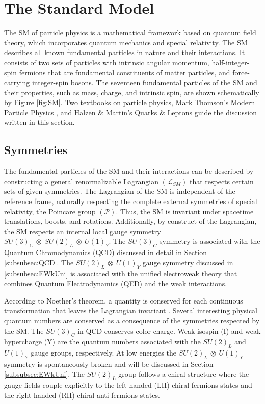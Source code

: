\section{The Standard Model}
\label{sec:SM}

The SM of particle physics is a mathematical framework based on quantum field theory, which incorporates quantum mechanics and special relativity. The SM describes all known fundamental particles in nature and their interactions. It consists of two sets of particles with intrinsic angular momentum, half-integer-spin fermions that are fundamental constituents of matter particles, and force-carrying integer-spin bosons. The seventeen fundamental particles of the SM and their properties, such as mass, charge, and intrinsic spin, are shown schematically by Figure \ref{fig:SM}. Two textbooks on particle physics, Mark Thomson's Modern Particle Physics \cite{Thomson:2013zua}, and Halzen $\&$ Martin's Quarks $\&$ Leptons \cite{Halzen:1984mc} guide the discussion written in this section.

\subsection{Symmetries}
\label{subsec:Symmetries}
The fundamental particles of the SM and their interactions can be described by constructing a general renormalizable Lagrangian $(\mathcal{L}_{SM})$ that respects certain sets of given symmetries. The Lagrangian of the SM is independent of the reference frame, naturally respecting the complete external symmetries of special relativity, the Poincare group $(\mathcal{P})$. Thus, the SM is invariant under spacetime translations, boosts, and rotations. Additionally, by construct of the Lagrangian, the SM respects an internal local gauge symmetry $SU(3)_{C}~\otimes~SU(2)_{L}~\otimes~U(1)_{Y}$. The $SU(3)_{C}$ symmetry is associated with the Quantum Chromodynamics (QCD) discussed in detail in Section \ref{subsubsec:QCD}. The $SU(2)_{L}~\otimes~U(1)_{Y}$ gauge symmetry discussed in \ref{subsubsec:EWkUni} is associated with the unified electroweak theory that combines Quantum Electrodynamics (QED) and the weak interactions. 

According to Noether's theorem, a quantity is conserved for each continuous transformation that leaves the Lagrangian invariant \cite{NoetherTheorem}. Several interesting physical quantum numbers are conserved as a consequence of the symmetries respected by the SM. The $SU(3)_{C}$ in QCD conserves color charge. Weak isospin (I) and weak hypercharge (Y) are the quantum numbers associated with the $SU(2)_{L}$ and $U(1)_{Y}$ gauge groups, respectively. At low energies the $SU(2)_{L}~\otimes~U(1)_{Y}$ symmetry is spontaneously broken and will be discussed in Section \ref{subsubsec:EWkUni}. The $SU(2)_{L}$ group follows a chiral structure where the gauge fields couple explicitly to the left-handed (LH) chiral fermions states and the right-handed (RH) chiral anti-fermions states.

